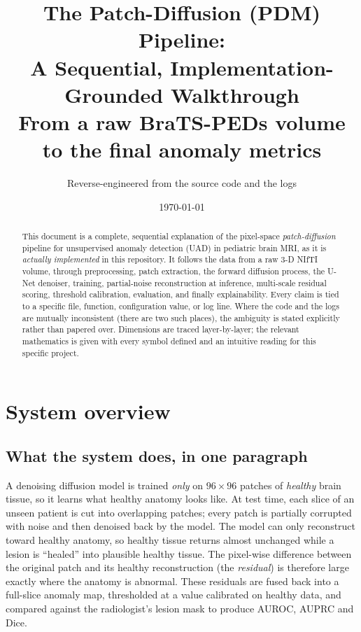 \documentclass[11pt,a4paper]{article}
\title{\textbf{The Patch-Diffusion (PDM) Pipeline:\\
A Sequential, Implementation-Grounded Walkthrough}\\[4pt]
\large From a raw BraTS-PEDs volume to the final anomaly metrics}
\author{Reverse-engineered from the source code and the \code{outputs/} logs}
\date{\today}
\begin{document}
\maketitle

\begin{abstract}
\noindent
This document is a complete, sequential explanation of the pixel-space
\emph{patch-diffusion} pipeline for unsupervised anomaly detection (UAD) in
pediatric brain MRI, as it is \emph{actually implemented} in this repository. It
follows the data from a raw 3-D NIfTI volume, through preprocessing, patch
extraction, the forward diffusion process, the U-Net denoiser, training,
partial-noise reconstruction at inference, multi-scale residual scoring,
threshold calibration, evaluation, and finally explainability. Every claim is
tied to a specific file, function, configuration value, or log line. Where the
code and the logs are mutually inconsistent (there are two such places), the
ambiguity is stated explicitly rather than papered over. Dimensions are traced
layer-by-layer; the relevant mathematics is given with every symbol defined and
an intuitive reading for this specific project.
\end{abstract}

\tableofcontents
\clearpage

\section{System overview}

\subsection{What the system does, in one paragraph}
A denoising diffusion model is trained \emph{only} on $96\times96$ patches of
\emph{healthy} brain tissue, so it learns what healthy anatomy looks like. At
test time, each slice of an unseen patient is cut into overlapping patches; every
patch is partially corrupted with noise and then denoised back by the model. The
model can only reconstruct toward healthy anatomy, so healthy tissue returns
almost unchanged while a lesion is ``healed'' into plausible healthy tissue. The
pixel-wise difference between the original patch and its healthy reconstruction
(the \emph{residual}) is therefore large exactly where the anatomy is abnormal.
These residuals are fused back into a full-slice anomaly map, thresholded at a
value calibrated on healthy data, and compared against the radiologist's lesion
mask to produce AUROC, AUPRC and Dice.
\end{document}
